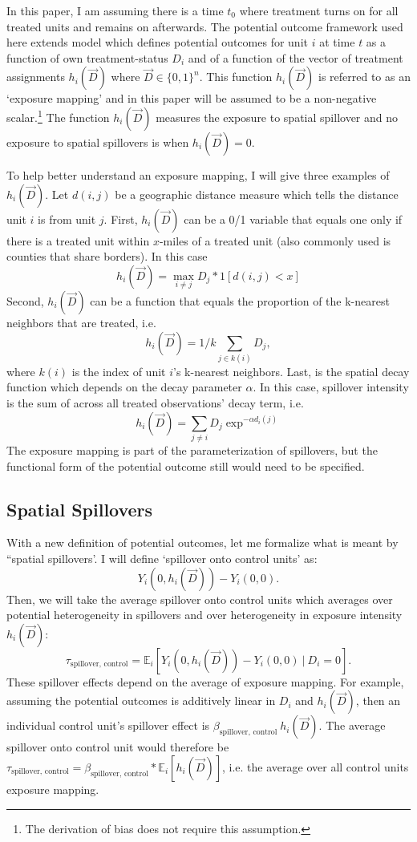 \documentclass[11pt]{article}
\begin{document}
In this paper, I am assuming there is a time $t_0$ where treatment turns on for all treated units and remains on afterwards. The potential outcome framework used here extends \citet{Vazquez-Bare_2019} model which defines potential outcomes for unit $i$ at time $t$ as a function of own treatment-status $D_i$ and of a function of the vector of treatment assignments $h_i(\vec{D})$ where $\vec{D} \in \{0,1 \}^n$. This function $h_i(\vec{D})$ is referred to as an `exposure mapping' and in this paper will be assumed to be a non-negative scalar.\footnote{The derivation of bias does not require this assumption.} The function $h_i(\vec{D})$ measures the exposure to spatial spillover and no exposure to spatial spillovers is when $h_i(\vec{D}) = 0$.

To help better understand an exposure mapping, I will give three examples of $h_i(\vec{D})$. Let $d(i,j)$ be a geographic distance measure which tells the distance unit $i$ is from unit $j$. First, $h_i(\vec{D})$ can be a 0/1 variable that equals one only if there is a treated unit within $x$-miles of a treated unit (also commonly used is counties that share borders). In this case \[
    h_i(\vec{D}) = \max_{i \neq j} D_j * 1[ d(i,j) < x ] 
\] Second, $h_i(\vec{D})$ can be a function that equals the proportion of the k-nearest neighbors that are treated, i.e. \[
    h_i(\vec{D}) = 1/k \sum_{j \in k(i)} D_j,
\]
where $k(i)$ is the index of unit $i$'s k-nearest neighbors. Last, is the spatial decay function which depends on  the decay parameter $\alpha$. In this case, spillover intensity is the sum of across all treated observations' decay term, i.e. \[ 
    h_i(\vec{D}) = \sum_{j \neq i} D_j \exp^{-\alpha d_i(j)}
\] 
The exposure mapping is part of the parameterization of spillovers, but the functional form of the potential outcome still would need to be specified. 



\subsection{Spatial Spillovers}

With a new definition of potential outcomes, let me formalize what is meant by ``spatial spillovers'. I will define `spillover onto control units' as: \[
    Y_{i}(0, h_i(\vec{D})) - Y_{i}(0, 0).
\] 
Then, we will take the average spillover onto control units which averages over potential heterogeneity in spillovers and over heterogeneity in exposure intensity $h_i(\vec{D})$: \[
    \tau_{\text{spillover, control}} = \mathbb{E}_i \left[ Y_{i}(0, h_i(\vec{D})) - Y_{i}(0, 0) \ \vert \ D_i = 0 \right].
\]
These spillover effects depend on the average of exposure mapping. For example, assuming the potential outcomes is additively linear in $D_i$ and $h_i(\vec{D})$, then an individual control unit's spillover effect is $\beta_{\text{spillover, control}} \ h_i(\vec{D})$. The average spillover onto control unit would therefore be $\tau_{\text{spillover, control}} = \beta_{\text{spillover, control}} * \mathbb{E}_{i} \left[ h_i(\vec{D})\right]$, i.e. the average over all control units exposure mapping.
\end{document}
